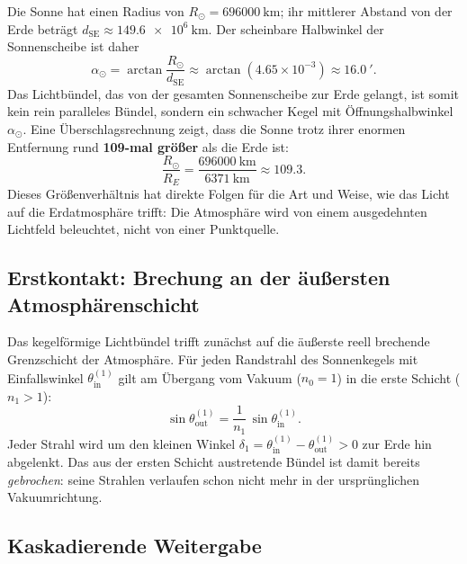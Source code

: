 ﻿\documentclass[12pt,a4paper]{article}
\begin{document}
Die Sonne hat einen Radius von $R_\odot = \SI{696000}{\kilo\metre}$;
ihr mittlerer Abstand von der Erde beträgt
$d_{\mathrm{SE}} \approx \SI{149.6e6}{\kilo\metre}$.
Der scheinbare Halbwinkel der Sonnenscheibe ist daher
\begin{equation}
  \alpha_\odot = \arctan\!\frac{R_\odot}{d_{\mathrm{SE}}}
               \approx \arctan(4.65\times 10^{-3})
               \approx \SI{16.0}{\arcminute}.
  \label{eq:alpha_sonne}
\end{equation}
Das Lichtbündel, das von der gesamten Sonnenscheibe zur Erde gelangt,
ist somit kein rein paralleles Bündel, sondern ein schwacher
Kegel mit Öffnungshalbwinkel $\alpha_\odot$.
Eine Überschlagsrechnung zeigt, dass die Sonne trotz ihrer enormen
Entfernung rund \textbf{109-mal größer} als die Erde ist:
\begin{equation}
  \frac{R_\odot}{R_E} = \frac{\SI{696000}{\kilo\metre}}{\SI{6371}{\kilo\metre}}
                       \approx 109.3.
  \label{eq:sonne_erde_groesse}
\end{equation}
Dieses Größenverhältnis hat direkte Folgen für die Art und Weise,
wie das Licht auf die Erdatmosphäre trifft:
Die Atmosphäre wird von einem ausgedehnten Lichtfeld beleuchtet,
nicht von einer Punktquelle.

\subsection{Erstkontakt: Brechung an der äußersten Atmosphärenschicht}

Das kegelförmige Lichtbündel trifft zunächst auf die äußerste
reell brechende Grenzschicht der Atmosphäre.
Für jeden Randstrahl des Sonnenkegels mit Einfallswinkel
$\theta_{\mathrm{in}}^{(1)}$ gilt am Übergang vom Vakuum
($n_0 = 1$) in die erste Schicht ($n_1 > 1$):
\begin{equation}
  \sin\theta_{\mathrm{out}}^{(1)} = \frac{1}{n_1}\,\sin\theta_{\mathrm{in}}^{(1)}.
  \label{eq:snell_schicht1}
\end{equation}
Jeder Strahl wird um den kleinen Winkel
$\delta_1 = \theta_{\mathrm{in}}^{(1)} - \theta_{\mathrm{out}}^{(1)} > 0$
zur Erde hin abgelenkt.
Das aus der ersten Schicht austretende Bündel ist damit bereits
\emph{gebrochen}: seine Strahlen verlaufen schon nicht mehr in der
ursprünglichen Vakuumrichtung.

\subsection{Kaskadierende Weitergabe}
\end{document}
